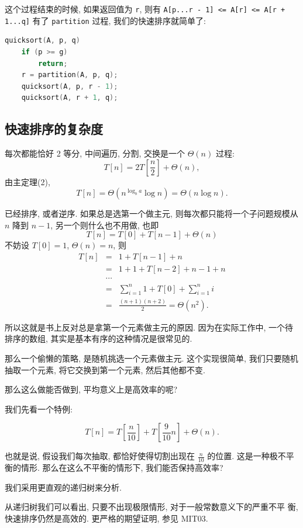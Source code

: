 \documentclass[a4paper]{ctexart}
\theoremstyle{definition}
\theoremstyle{definition}
\begin{document}
这个过程结束的时候, 如果返回值为 \verb|r|, 则有\newline 
\verb|A[p...r - 1] <= A[r] <= A[r + 1...q]|\newline
有了 \verb|partition| 过程, 我们的快速排序就简单了:

\begin{lstlisting}[language=C++]
quicksort(A, p, q)
	if (p >= g)
		return;
	r = partition(A, p, q);
	quicksort(A, p, r - 1);
	quicksort(A, r + 1, q);
\end{lstlisting}

\subsection{快速排序的复杂度}

 每次都能恰好 2 等分, 中间遍历, 分割,
交换是一个 $\Theta(n)$ 过程: 
$$ 
T[n] = 2T[\frac{n}{2}] + \Theta(n), 
$$
由主定理(2), 
$$ 
T[n] = \Theta(n^{\log_ba}\log n) = \Theta(n\log n).  
$$

 已经排序, 或者逆序. 如果总是选第一个做主元,
则每次都只能将一个子问题规模从 $n$ 降到 $n - 1$, 另一个则什么也不用做,
也即
$$
T[n] = T[0] + T[n - 1] + \Theta(n)
$$
不妨设 $T[0] = 1$, $\Theta(n) = n$, 则
$$
\begin{array}{rcl}
T[n] &=& 1 + T[n - 1] + n \\
&=& 1 + 1 + T[n - 2] + n - 1 + n \\
&\cdots&\\
&=& \sum_{i = 1}^{n} 1 + T[0] + \sum_{i = 1}^n i \\
&=& \frac{(n + 1)(n + 2)}{2} = \Theta(n^2).
\end{array}
$$

所以这就是书上反对总是拿第一个元素做主元的原因. 因为在实际工作中,
一个待排序的数组, 其实是基本有序的这种情况是很常见的.

那么一个偷懒的策略, 是随机挑选一个元素做主元. 这个实现很简单,
我们只要随机抽取一个元素, 将它交换到第一个元素, 然后其他都不变.

那么这么做能否做到, 平均意义上是高效率的呢?

我们先看一个特例:

$$
T[n] = T[\frac{n}{10}] + T[\frac{9}{10}n] + \Theta(n).
$$

也就是说, 假设我们每次抽取, 都恰好使得切割出现在 $\frac{n}{10}$ 的位置.
这是一种极不平衡的情形. 那么在这么不平衡的情形下, 我们能否保持高效率? 

我们采用更直观的递归树来分析.

从递归树我们可以看出, 只要不出现极限情形, 对于一般常数意义下的严重不平
衡, 快速排序仍然是高效的. 更严格的期望证明, 参见 MIT03.
\end{document}
